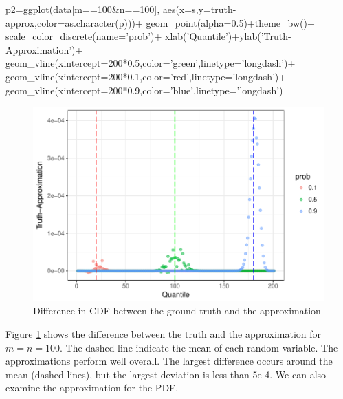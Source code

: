 \begin{example}
p2=ggplot(data[m==100&n==100],
	aes(x=s,y=truth-approx,color=as.character(p)))+
	geom_point(alpha=0.5)+theme_bw()+
	scale_color_discrete(name='prob')+
	xlab('Quantile')+ylab('Truth-Approximation')+
	geom_vline(xintercept=200*0.5,color='green',linetype='longdash')+
	geom_vline(xintercept=200*0.1,color='red',linetype='longdash')+
	geom_vline(xintercept=200*0.9,color='blue',linetype='longdash')
\end{example}

\begin{figure}[h]
\includegraphics[width=\textwidth]{truth_minus_approximation.pdf}
\caption{Difference in CDF between the ground truth and the approximation}
\label{fig:2}
\end{figure}


Figure \ref{fig:2} shows the difference between the truth and the approximation for $m=n=100$. The dashed line indicate the mean of each random variable. The approximations perform well overall. The largest difference occurs around the mean (dashed lines), but the largest deviation is less than 5e-4. We can also examine the approximation for the PDF. 


